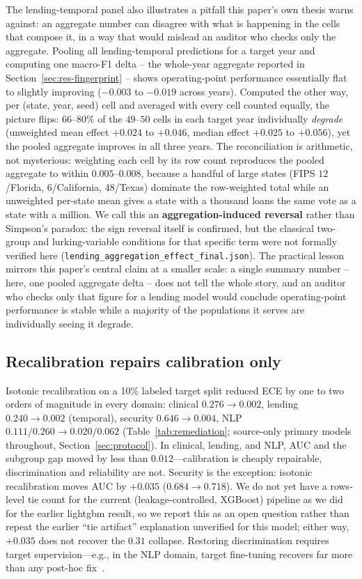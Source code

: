 \documentclass[11pt]{article}
\begin{document}
The lending-temporal panel also illustrates a pitfall this paper's own thesis warns against: an
aggregate number can disagree with what is happening in the cells that compose it, in a way that
would mislead an auditor who checks only the aggregate. Pooling all lending-temporal predictions
for a target year and computing one macro-F1 delta -- the whole-year aggregate reported in
Section~\ref{sec:res-fingerprint} -- shows operating-point performance essentially flat to
slightly improving ($-0.003$ to $-0.019$ across years). Computed the other way, per (state, year,
seed) cell and averaged with every cell counted equally, the picture flips: $66$--$80\%$ of the
$49$--$50$ cells in each target year individually \emph{degrade} (unweighted mean effect
$+0.024$ to $+0.046$, median effect $+0.025$ to $+0.056$), yet the pooled aggregate improves in all
three years. The reconciliation is arithmetic, not mysterious: weighting each cell by its row count
reproduces the pooled aggregate to within $0.005$--$0.008$, because a handful of large states (FIPS
$12$/Florida, $6$/California, $48$/Texas) dominate the row-weighted total while an unweighted
per-state mean gives a state with a thousand loans the same vote as a state with a million. We call
this an \textbf{aggregation-induced reversal} rather than Simpson's paradox: the sign reversal
itself is confirmed, but the classical two-group and lurking-variable conditions for that specific
term were not formally verified here (\texttt{lending\_aggregation\_effect\_final.json}). The
practical lesson mirrors this paper's central claim at a smaller scale: a single summary number --
here, one pooled aggregate delta -- does not tell the whole story, and an auditor who checks only
that figure for a lending model would conclude operating-point performance is stable while a
majority of the populations it serves are individually seeing it degrade.

\subsection{Recalibration repairs calibration only}\label{sec:res-remediation}

Isotonic recalibration on a 10\% labeled target split reduced ECE by one to two orders of
magnitude in every domain: clinical $0.276\rightarrow 0.002$, lending $0.240\rightarrow 0.002$
(temporal), security $0.646\rightarrow 0.004$, NLP $0.111/0.260\rightarrow 0.020/0.062$
(Table~\ref{tab:remediation}; source-only primary models throughout, Section~\ref{sec:protocol}).
In clinical, lending, and NLP, AUC and the subgroup gap moved by less than $0.012$---calibration is
cheaply repairable, discrimination and reliability are not. Security is the exception: isotonic
recalibration moves AUC by $+0.035$ ($0.684\rightarrow0.718$). We do not yet have a rows-level tie
count for the current (leakage-controlled, XGBoost) pipeline as we did for the earlier lightgbm
result, so we report this as an open question rather than repeat the earlier ``tie artifact''
explanation unverified for this model; either way, $+0.035$ does not recover the $0.31$ collapse.
Restoring discrimination requires target supervision---e.g., in the NLP domain, target fine-tuning
recovers far more than any post-hoc fix~\citep{pall2026cpfe}.
\end{document}
